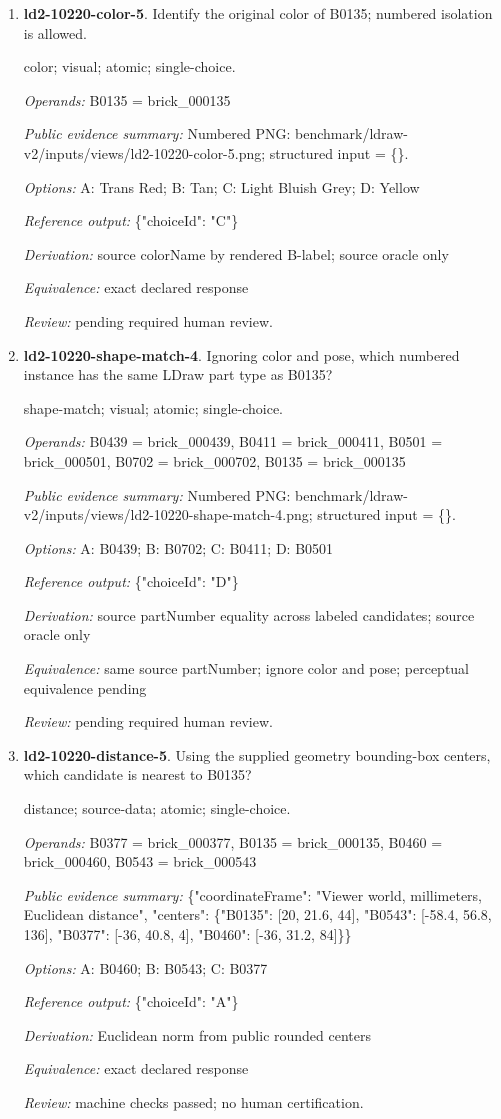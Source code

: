 \begin{enumerate}
\item \textbf{ld2-10220-color-5}. Identify the original color of B0135; numbered isolation is allowed.
\par{\small color; visual; atomic; single-choice.\par\textit{Operands:} B0135 = brick\_000135\par\textit{Public evidence summary:} Numbered PNG: benchmark/ldraw-v2/inputs/views/ld2-10220-color-5.png; structured input = \{\}.\par\textit{Options:} A: Trans Red; B: Tan; C: Light Bluish Grey; D: Yellow\par\textit{Reference output:} \{"choiceId": "C"\}\par\textit{Derivation:} source colorName by rendered B-label; source oracle only\par\textit{Equivalence:} exact declared response\par\textit{Review:} pending required human review.}
\item \textbf{ld2-10220-shape-match-4}. Ignoring color and pose, which numbered instance has the same LDraw part type as B0135?
\par{\small shape-match; visual; atomic; single-choice.\par\textit{Operands:} B0439 = brick\_000439, B0411 = brick\_000411, B0501 = brick\_000501, B0702 = brick\_000702, B0135 = brick\_000135\par\textit{Public evidence summary:} Numbered PNG: benchmark/ldraw-v2/inputs/views/ld2-10220-shape-match-4.png; structured input = \{\}.\par\textit{Options:} A: B0439; B: B0702; C: B0411; D: B0501\par\textit{Reference output:} \{"choiceId": "D"\}\par\textit{Derivation:} source partNumber equality across labeled candidates; source oracle only\par\textit{Equivalence:} same source partNumber; ignore color and pose; perceptual equivalence pending\par\textit{Review:} pending required human review.}
\item \textbf{ld2-10220-distance-5}. Using the supplied geometry bounding-box centers, which candidate is nearest to B0135?
\par{\small distance; source-data; atomic; single-choice.\par\textit{Operands:} B0377 = brick\_000377, B0135 = brick\_000135, B0460 = brick\_000460, B0543 = brick\_000543\par\textit{Public evidence summary:} \{"coordinateFrame": "Viewer world, millimeters, Euclidean distance", "centers": \{"B0135": [20, 21.6, 44], "B0543": [-58.4, 56.8, 136], "B0377": [-36, 40.8, 4], "B0460": [-36, 31.2, 84]\}\}\par\textit{Options:} A: B0460; B: B0543; C: B0377\par\textit{Reference output:} \{"choiceId": "A"\}\par\textit{Derivation:} Euclidean norm from public rounded centers\par\textit{Equivalence:} exact declared response\par\textit{Review:} machine checks passed; no human certification.}

\end{enumerate}
